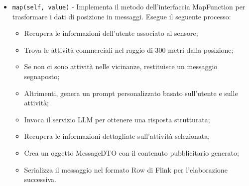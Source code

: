 \documentclass[10pt]{article}
\begin{document}
\begin{itemize}
\begin{itemize}
        \item \texttt{map(self, value)} - Implementa il metodo dell'interfaccia MapFunction per trasformare i dati di posizione in messaggi. Esegue il seguente processo:
        \begin{itemize}
            \item Recupera le informazioni dell'utente associato al sensore;
            \item Trova le attività commerciali nel raggio di 300 metri dalla posizione;
            \item Se non ci sono attività nelle vicinanze, restituisce un messaggio segnaposto;
            \item Altrimenti, genera un prompt personalizzato basato sull'utente e sulle attività;
            \item Invoca il servizio LLM per ottenere una risposta strutturata;
            \item Recupera le informazioni dettagliate sull'attività selezionata;
            \item Crea un oggetto MessageDTO con il contenuto pubblicitario generato;
            \item Serializza il messaggio nel formato Row di Flink per l'elaborazione successiva.
        \end{itemize}
    \end{itemize}
    \end{itemize}
\end{document}

